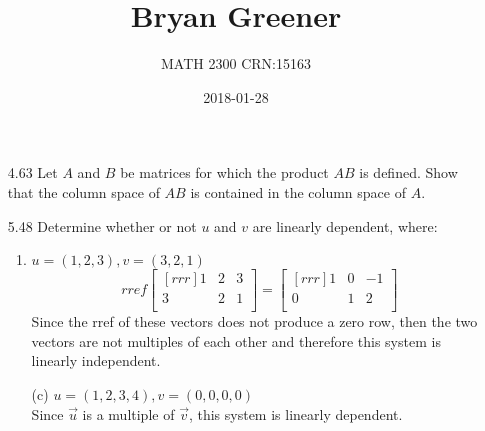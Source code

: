 \documentclass[12pt]{article}
\title{Bryan Greener}
\author{MATH 2300 CRN:15163}
\date{2018-01-28}
\begin{document}
\maketitle

\TabPositions{4cm}

\begin{enumerate}
\item[4.63] Let $A$ and $B$ be matrices for which the product $AB$ is defined. Show that the column space of $AB$ is contained in the column space of $A$.

\item[5.48] Determine whether or not $u$ and $v$ are linearly dependent, where:
	\begin{enumerate}
	\item $u=(1,2,3),v=(3,2,1)$\\
		\[ rref\begin{bmatrix}[rrr]1&2&3\\3&2&1\\\end{bmatrix} =
		\begin{bmatrix}[rrr]1&0&-1\\0&1&2\\\end{bmatrix} \]
		Since the rref of these vectors does not produce a zero row, then the two vectors are not multiples of each other and therefore this system is linearly independent.
	\item[(c)] $u=(1,2,3,4),v=(0,0,0,0)$\\
		Since $\vec{u}$ is a multiple of $\vec{v}$, this system is linearly dependent.
	\end{enumerate}
	

\end{enumerate}
\end{document}
